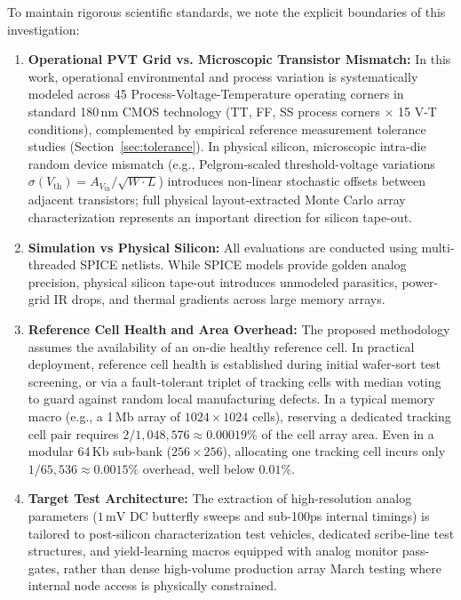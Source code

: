 \documentclass[conference]{IEEEtran}
\begin{document}
To maintain rigorous scientific standards, we note the explicit boundaries of this investigation:
\begin{enumerate}
    \item \textbf{Operational PVT Grid vs. Microscopic Transistor Mismatch:} In this work, operational environmental and process variation is systematically modeled across 45 Process-Voltage-Temperature operating corners in standard 180\,nm CMOS technology (TT, FF, SS process corners $\times$ 15 V-T conditions), complemented by empirical reference measurement tolerance studies (Section~\ref{sec:tolerance}). In physical silicon, microscopic intra-die random device mismatch (e.g., Pelgrom-scaled threshold-voltage variations $\sigma(V_{\text{th}}) = A_{V_{\text{th}}} / \sqrt{W \cdot L}$) introduces non-linear stochastic offsets between adjacent transistors; full physical layout-extracted Monte Carlo array characterization represents an important direction for silicon tape-out.
    \item \textbf{Simulation vs Physical Silicon:} All evaluations are conducted using multi-threaded SPICE netlists. While SPICE models provide golden analog precision, physical silicon tape-out introduces unmodeled parasitics, power-grid IR drops, and thermal gradients across large memory arrays.
    \item \textbf{Reference Cell Health and Area Overhead:} The proposed methodology assumes the availability of an on-die healthy reference cell. In practical deployment, reference cell health is established during initial wafer-sort test screening, or via a fault-tolerant triplet of tracking cells with median voting to guard against random local manufacturing defects. In a typical memory macro (e.g., a 1\,Mb array of $1024 \times 1024$ cells), reserving a dedicated tracking cell pair requires $2 / 1{,}048{,}576 \approx 0.00019\%$ of the cell array area. Even in a modular 64\,Kb sub-bank ($256 \times 256$), allocating one tracking cell incurs only $1 / 65{,}536 \approx 0.0015\%$ overhead, well below $0.01\%$.
    \item \textbf{Target Test Architecture:} The extraction of high-resolution analog parameters ($1\,\text{mV}$ DC butterfly sweeps and sub-100ps internal timings) is tailored to post-silicon characterization test vehicles, dedicated scribe-line test structures, and yield-learning macros equipped with analog monitor pass-gates, rather than dense high-volume production array March testing where internal node access is physically constrained.

\end{enumerate}
\end{document}
